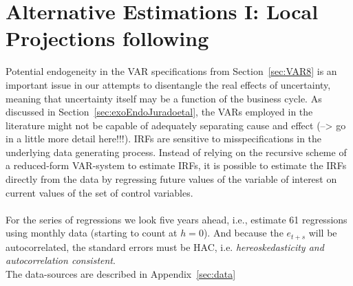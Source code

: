 \documentclass[a4paper,11pt,listof=nochaptergap,oneside,pointednumbers,bibtotoc,bigheadings,liststotoc]{scrbook}
\theoremstyle{mysatz}
\theoremstyle{mydefinition}
\theoremstyle{mybemerkung}
\begin{document}
\section{Alternative Estimations I: Local Projections following \citet{jorda:05}}
\label{sec:jorda05}

Potential endogeneity in the VAR specifications from Section~\ref{sec:VAR8} is an important issue in our attempts to disentangle the real effects of uncertainty, meaning that uncertainty itself may be a function of the business cycle. As discussed in Section~\ref{sec:exoEndoJuradoetal}, the VARs employed in the literature might not be capable of adequately separating cause and effect (--> go in a little more detail here!!!). IRFs are sensitive to misspecifications in the underlying data generating process. Instead of relying on the recursive scheme of a reduced-form VAR-system to estimate IRFs, it is possible to estimate the IRFs directly from the data by regressing future values of the variable of interest on current values of the set of control variables. \\
\\
For the series of regressions we look five years ahead, i.e., estimate 61 regressions using monthly data (starting to count at $h=0$). And because the $e_{t+s}$ will be autocorrelated, the standard errors must be HAC, i.e. \textit{hereoskedasticity and autocorrelation consistent}.\\
The data-sources are described in Appendix~\ref{sec:data}
\end{document}
